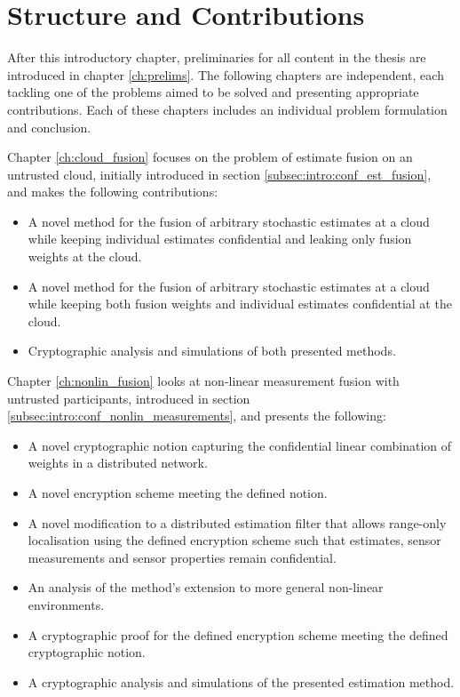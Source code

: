 % 
%                                                
%                                                
%                                                
% 

\section{Structure and Contributions}\label{sec:intro:contributions}
After this introductory chapter, preliminaries for all content in the thesis are introduced in chapter \ref{ch:prelims}. The following chapters are independent, each tackling one of the problems aimed to be solved and presenting appropriate contributions. Each of these chapters includes an individual problem formulation and conclusion. 

Chapter \ref{ch:cloud_fusion} focuses on the problem of estimate fusion on an untrusted cloud, initially introduced in section \ref{subsec:intro:conf_est_fusion}, and makes the following contributions:
\begin{itemize}
    \item A novel method for the fusion of arbitrary stochastic estimates at a cloud while keeping individual estimates confidential and leaking only fusion weights at the cloud.
    \item A novel method for the fusion of arbitrary stochastic estimates at a cloud while keeping both fusion weights and individual estimates confidential at the cloud.
    \item Cryptographic analysis and simulations of both presented methods.
\end{itemize}

Chapter \ref{ch:nonlin_fusion} looks at non-linear measurement fusion with untrusted participants, introduced in section \ref{subsec:intro:conf_nonlin_measurements}, and presents the following:
\begin{itemize}
    \item A novel cryptographic notion capturing the confidential linear combination of weights in a distributed network.
    \item A novel encryption scheme meeting the defined notion.
    \item A novel modification to a distributed estimation filter that allows range-only localisation using the defined encryption scheme such that estimates, sensor measurements and sensor properties remain confidential.
    \item An analysis of the method's extension to more general non-linear environments.
    \item A cryptographic proof for the defined encryption scheme meeting the defined cryptographic notion.
    \item A cryptographic analysis and simulations of the presented estimation method.
\end{itemize}


